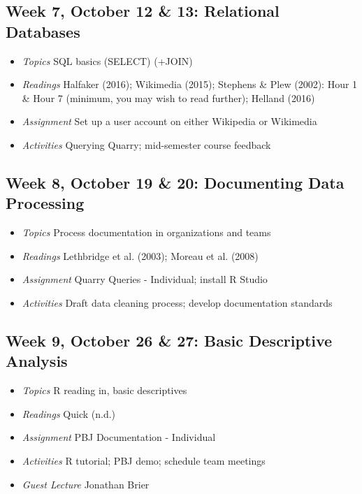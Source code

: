 \documentclass[11pt]{article}
\begin{document}
\subsection*{Week 7, October 12 \& 13: Relational Databases}
\begin{itemize}
\item \textit{Topics} SQL basics (SELECT) (+JOIN)
\item \textit{Readings} Halfaker (2016); Wikimedia (2015); Stephens \& Plew (2002): Hour 1 \& Hour 7 (minimum, you may wish to read further); Helland (2016)
\item \textit{Assignment} Set up a user account on either Wikipedia or Wikimedia
\item \textit{Activities} Querying Quarry; mid-semester course feedback
\end{itemize}

\subsection*{Week 8, October 19 \& 20: Documenting Data Processing}
\begin{itemize}
\item \textit{Topics} Process documentation in organizations and teams
\item \textit{Readings} Lethbridge et al. (2003); Moreau et al. (2008)
\item \textit{Assignment} Quarry Queries - Individual; install R Studio
\item \textit{Activities} Draft data cleaning process; develop documentation standards
\end{itemize}

\subsection*{Week 9, October 26 \& 27: Basic Descriptive Analysis}
\begin{itemize}
\item \textit{Topics} R reading in, basic descriptives
\item \textit{Readings} Quick (n.d.)
\item \textit{Assignment} PBJ Documentation - Individual
\item \textit{Activities} R tutorial; PBJ demo; schedule team meetings
\item \textit{Guest Lecture} Jonathan Brier
\end{itemize}
\end{document}
